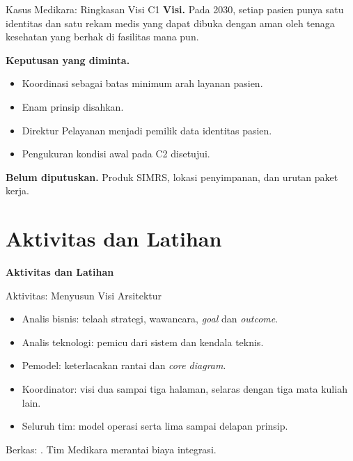\documentclass[aspectratio=169, table, 12pt]{beamer}
\begin{document}
\begin{frame}{{\Large Kasus Medikara: Ringkasan Visi C1}}
  \small
  \textbf{Visi.} Pada 2030, setiap pasien punya satu identitas dan satu rekam medis yang dapat
  dibuka dengan aman oleh tenaga kesehatan yang berhak di fasilitas mana pun.

  \vspace{4pt}
  \textbf{Keputusan yang diminta.}
  \begin{itemize}
    \item Koordinasi sebagai batas minimum arah layanan pasien.
    \item Enam prinsip disahkan.
    \item Direktur Pelayanan menjadi pemilik data identitas pasien.
    \item Pengukuran kondisi awal pada C2 disetujui.
  \end{itemize}
  \vspace{4pt}
  \textbf{Belum diputuskan.} Produk SIMRS, lokasi penyimpanan, dan urutan paket kerja.
\end{frame}

\section{Aktivitas dan Latihan}

\begin{frame}{\hfill}
  \centering
  \Huge{\textbf{Aktivitas dan Latihan}}
\end{frame}

\begin{frame}{{\Large Aktivitas: Menyusun Visi Arsitektur}}
  \vspace{6pt}
  \begin{itemize}
    \item Analis bisnis: telaah strategi, wawancara, \textit{goal} dan \textit{outcome}.
    \item Analis teknologi: pemicu dari sistem dan kendala teknis.
    \item Pemodel: keterlacakan rantai dan \textit{core diagram}.
    \item Koordinator: visi dua sampai tiga halaman, selaras dengan tiga mata kuliah lain.
    \item Seluruh tim: model operasi serta lima sampai delapan prinsip.
  \end{itemize}
  \vspace{4pt}
  {\small Berkas: . Tim Medikara merantai biaya integrasi.}
\end{frame}
\end{document}
